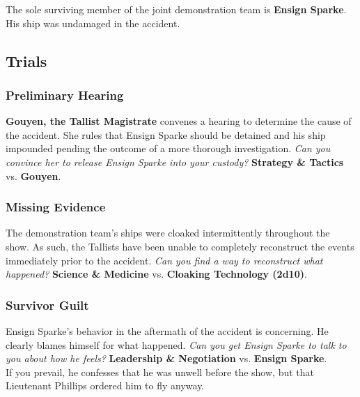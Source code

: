 \documentclass[11pt, a5paper, parskip=half-, DIV=12]{scrartcl}
\begin{document}
The sole surviving member of the joint demonstration team is \textbf{Ensign Sparke}. His ship was undamaged in the accident.

\newpage

\subsection*{Trials}

\subsubsection*{Preliminary Hearing}
\textbf{Gouyen, the Tallist Magistrate} convenes a hearing to determine the cause of the accident. She rules that Ensign Sparke should be detained and his ship impounded pending the outcome of a more thorough investigation. \textit{Can you convince her to release Ensign Sparke into your custody?} \textbf{Strategy \& Tactics} vs. \textbf{Gouyen}.

\subsubsection*{Missing Evidence}
The demonstration team's ships were cloaked intermittently throughout the show. As such, the Tallists have been unable to completely reconstruct the events immediately prior to the accident. \textit{Can you find a way to reconstruct what happened?} \textbf{Science \& Medicine} vs. \textbf{Cloaking Technology (2d10)}. 


\subsubsection*{Survivor Guilt}
Ensign Sparke's behavior in the aftermath of the accident is concerning. He clearly blames himself for what happened. \textit{Can you get Ensign Sparke to talk to you about how he feels?} \textbf{Leadership \& Negotiation} vs. \textbf{Ensign Sparke}. \\ If you prevail, he confesses that he was unwell before the show, but that Lieutenant Phillips ordered him to fly anyway.%
\end{document}
